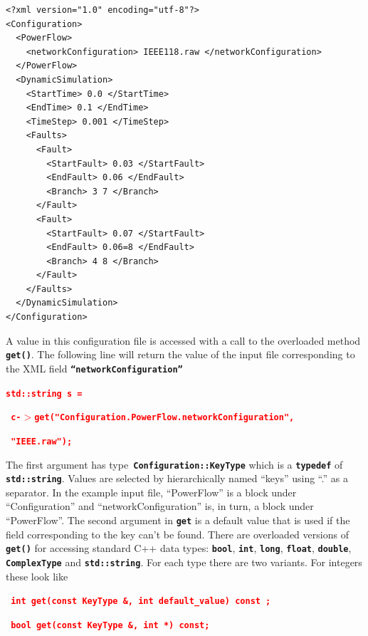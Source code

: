 \documentclass[12pt]{report} %
\begin{document}
{
\color{blue}
\bfseries
\begin{Verbatim}[commandchars=\\\{\}]
<?xml version="1.0" encoding="utf-8"?>
<Configuration>
  <PowerFlow>
    <networkConfiguration> IEEE118.raw </networkConfiguration>
  </PowerFlow>
  <DynamicSimulation>
    <StartTime> 0.0 </StartTime>
    <EndTime> 0.1 </EndTime>
    <TimeStep> 0.001 </TimeStep>
    <Faults>
      <Fault>
        <StartFault> 0.03 </StartFault>
        <EndFault> 0.06 </EndFault>
        <Branch> 3 7 </Branch>
      </Fault>
      <Fault>
        <StartFault> 0.07 </StartFault>
        <EndFault> 0.06=8 </EndFault>
        <Branch> 4 8 </Branch>
      </Fault>
    </Faults>
  </DynamicSimulation>
</Configuration>
\end{Verbatim}
}

A value in this configuration file is accessed with a call to the overloaded method \texttt{\textbf{get()}}. The following line will return the value of the input file corresponding to the XML field \texttt{\textbf{``networkConfiguration''}}

\textcolor{red}{\texttt{\textbf{std::string s = }}}

\textcolor{red}{\texttt{\textbf{    c-$\boldsymbol{\mathrm{>}}$get("Configuration.PowerFlow.networkConfiguration",  }}}

\textcolor{red}{\texttt{\textbf{    "IEEE.raw");}}}

The first argument has type\texttt{\textbf{ Configuration::KeyType}} which is a \texttt{\textbf{typedef}} of \texttt{\textbf{std::string}}. Values are selected by hierarchically named ``keys'' using ``.'' as a separator. In the example input file, ``PowerFlow'' is a block under ``Configuration'' and ``networkConfiguration'' is, in turn, a block under ``PowerFlow''. The second argument in \texttt{\textbf{get}} is a default value that is used if the field corresponding to the key can't be found. There are overloaded versions of \texttt{\textbf{get()}} for accessing standard C++ data types: \texttt{\textbf{bool}}, \texttt{\textbf{int}}, \texttt{\textbf{long}}, \texttt{\textbf{float}}, \texttt{\textbf{double}}, \texttt{\textbf{ComplexType}} and \texttt{\textbf{std::string}}. For each type there are two variants. For integers these look like 

\textcolor{red}{\texttt{\textbf{ int get(const KeyType \&, int default\_value) const ;}}}

\textcolor{red}{\texttt{\textbf{ bool get(const KeyType \&, int *) const;}}}
\end{document}
